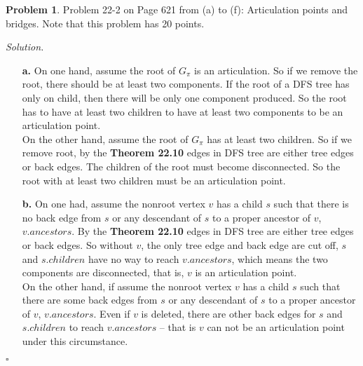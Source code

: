 \documentclass[11pt]{article}
\theoremstyle{definition}
\newtheorem{problem}{Problem}
\newenvironment{solution}{\noindent\emph{Solution.}}{\hfill$\square$}
\newcommand\tab[1][1cm]{\hspace*{#1}}
\begin{document}
\newpage



\begin{problem}
Problem 22-2 on Page 621 from (a) to (f): Articulation points and bridges. Note that this problem has 20 points.
\end{problem}

\begin{solution}
\begin{enumerate}

 \item[\textbf{a.}] \tab On one hand, assume the root of $G_{\pi}$ is an articulation. So if we remove the root, there should be at least two components. If the root of a DFS tree has only on child, then there will be only one component produced. So the root has to have at least two children to have at least two components to be an articulation point. \\
 \tab On the other hand,  assume the root of $G_{\pi}$ has at least two children. So if we remove root, by the \textbf{Theorem 22.10} edges in DFS tree are either tree edges or back edges. The children of the root must become disconnected. So the root with at least two children must be an articulation point.
 
  \item[\textbf{b.}] \tab On one had, assume the nonroot vertex $v$ has a child $s$ such that there is no back edge from $s$ or any descendant of $s$ to a proper ancestor of $v$, $v.ancestors$. By the \textbf{Theorem 22.10} edges in DFS tree are either tree edges or back edges. So without $v$, the only tree edge and back edge are cut off, $s$ and $s.children$ have no way to reach $v.ancestors$, which means the two components are disconnected, that is, $v$ is an articulation point.\\
  \tab On the other hand, if assume the nonroot vertex $v$ has a child $s$ such that there are some back edges from $s$ or any descendant of $s$ to a proper ancestor of $v$, $v.ancestors$. Even if $v$ is deleted, there are other back edges for $s$ and $s.children$ to reach $v.ancestors$ -- that is $v$ can not be an articulation point under this circumstance.\\
  

\end{enumerate}
\end{solution}
\end{document}
